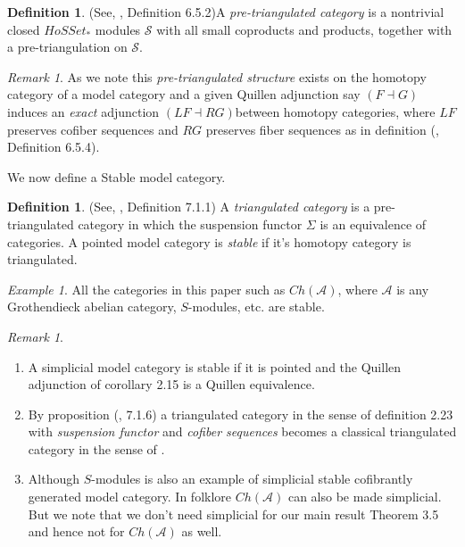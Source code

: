 \documentclass{article}
\theoremstyle{definition}
\newtheorem{definition}[theorem]{Definition}
\theoremstyle{remark}
\newtheorem{remark}[theorem]{Remark}
\newtheorem{example}[theorem]{Example}
\begin{document}
\begin{definition}
    (See, \cite{MR1650134}, Definition 6.5.2)\label{def:pretriCat} A \textit{pre-triangulated category} is a nontrivial closed $HoSSet_{*}$ modules $\mathcal{S}$ with all small coproducts and products, together with a pre-triangulation on $\mathcal{S}.$
\end{definition}
\begin{remark}
    As we note this \textit{pre-triangulated structure} exists on the homotopy category of a model category and a given Quillen adjunction say $(F \dashv G)$ induces an \textit{exact} adjunction $(LF \dashv RG)$between homotopy categories, where $LF$ preserves cofiber sequences and $RG$ preserves fiber sequences as in definition (\cite{MR1650134}, Definition 6.5.4). 
\end{remark}
 We now define a Stable model category.
 \begin{definition}\label{def:Hoveytricat}
     (See, \cite{MR1650134}, Definition 7.1.1) A \textit{triangulated category} is a pre-triangulated category in which the suspension functor $\Sigma$ is an equivalence of categories.\label{def:stabmodcat} A pointed model category is \textit{stable} if it's homotopy category is triangulated.
 \end{definition}
 \begin{example}
     All the categories in this paper such as $Ch(\mathcal{A})$, where $\mathcal{A}$ is any Grothendieck abelian category, \cite{MR1417719} $S$-modules, etc. are stable.
 \end{example}
 \begin{remark} \label{rem:factstri}
 \begin{enumerate}
     \item \label{ite:stabquilleneq} A simplicial model category is stable if it is pointed and the Quillen adjunction of corollary 2.15 is a Quillen equivalence.
     \item \label{ite:hoveyvsverdier} By proposition (\cite{MR1650134}, 7.1.6) a triangulated category in the sense of definition 2.23 with \textit{suspension functor} and \textit{cofiber sequences} becomes a classical triangulated category in the sense of \cite{neeman:trcat}.
     \item Although \cite{MR1417719} $S$-modules is also an example of simplicial stable cofibrantly generated model category. In folklore $Ch(\mathcal{A})$ can also be made simplicial. But we note that we don't need simplicial for our main result Theorem 3.5 and hence not for $Ch(\mathcal{A})$ as well.
\end{enumerate}
 \end{remark}
\end{document}
